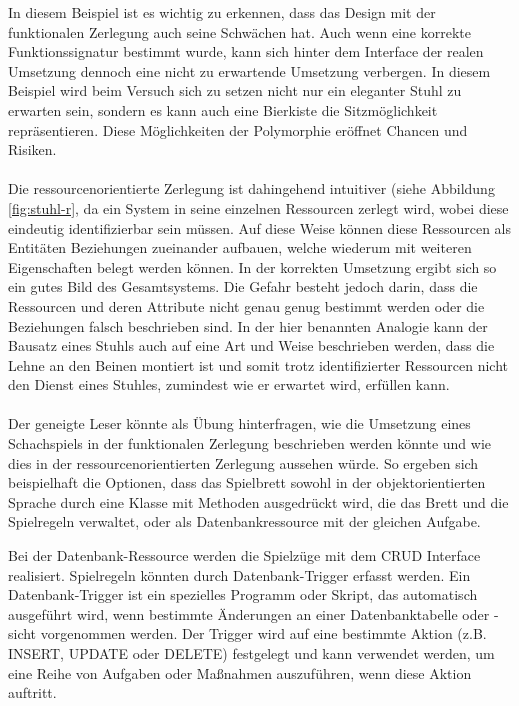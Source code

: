 \documentclass[../vs-script-first-v01.tex]{subfiles}
\begin{document}
In diesem Beispiel ist es wichtig zu erkennen, dass das Design mit der funktionalen Zerlegung auch seine Schwächen hat. Auch wenn eine korrekte Funktionssignatur bestimmt wurde, kann sich hinter dem Interface der realen Umsetzung dennoch eine nicht zu erwartende Umsetzung verbergen. In diesem  Beispiel wird beim Versuch sich zu setzen nicht nur ein eleganter Stuhl zu erwarten sein, sondern es kann auch eine Bierkiste die Sitzmöglichkeit repräsentieren. Diese Möglichkeiten der Polymorphie eröffnet Chancen und Risiken.  
\\\\
Die ressourcenorientierte Zerlegung ist dahingehend intuitiver (siehe Abbildung \ref{fig:stuhl-r}, da ein System in seine einzelnen Ressourcen zerlegt wird, wobei diese eindeutig identifizierbar sein müssen. Auf diese Weise können diese Ressourcen als Entitäten Beziehungen zueinander aufbauen, welche wiederum mit weiteren Eigenschaften belegt werden können. In der korrekten Umsetzung ergibt sich so ein gutes Bild des Gesamtsystems. Die Gefahr besteht jedoch darin, dass die Ressourcen und deren Attribute nicht genau genug bestimmt werden oder die Beziehungen falsch beschrieben sind. In der hier benannten Analogie kann der Bausatz eines Stuhls auch auf eine Art und Weise beschrieben werden, dass die Lehne an den Beinen montiert ist und somit trotz identifizierter Ressourcen nicht den Dienst eines Stuhles, zumindest wie er erwartet wird, erfüllen kann.
\\\\
Der geneigte Leser könnte als Übung hinterfragen, wie die Umsetzung eines Schachspiels in der funktionalen Zerlegung beschrieben werden könnte und wie dies in der ressourcenorientierten Zerlegung aussehen würde. So ergeben sich beispielhaft die Optionen, dass das Spielbrett sowohl in der objektorientierten Sprache durch eine Klasse mit Methoden ausgedrückt wird, die das Brett und die Spielregeln verwaltet, oder als Datenbankressource mit der gleichen Aufgabe.

Bei der Datenbank-Ressource werden die Spielzüge mit dem CRUD Interface realisiert. Spielregeln könnten durch Datenbank-Trigger erfasst werden. Ein Datenbank-Trigger ist ein spezielles Programm oder Skript, das  automatisch ausgeführt wird, wenn bestimmte Änderungen an einer Datenbanktabelle oder -sicht vorgenommen werden. Der Trigger wird auf eine bestimmte Aktion (z.B. INSERT, UPDATE oder DELETE) festgelegt und kann verwendet werden, um eine Reihe von Aufgaben oder Maßnahmen auszuführen, wenn diese Aktion auftritt.
\end{document}
